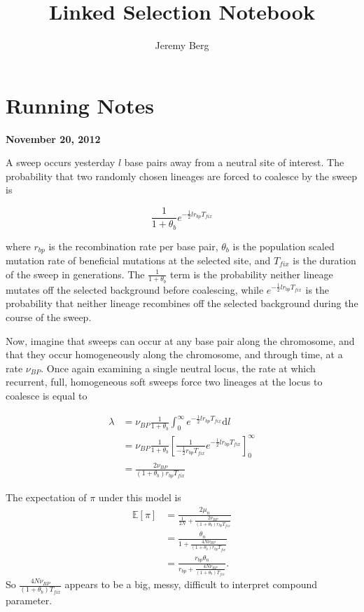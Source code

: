 \documentclass[reqno]{amsart}
\begin{document}
\title{Linked Selection Notebook}
\author{Jeremy Berg}
\date{}
\maketitle



\section*{Running Notes}

\begin{flushright}
	\textbf{November 20, 2012}
\end{flushright}

A sweep occurs yesterday $l$ base pairs away from a neutral site of interest. The probability that two randomly chosen lineages are forced to coalesce by the sweep is


$$\frac{1}{1 + \theta_b}e^{-\frac{1}{2}lr_{bp}T_{fix}}$$

where $r_{bp}$ is the recombination rate per base pair, $\theta_b$ is the population scaled mutation rate of beneficial mutations at the selected site, and $T_{fix}$ is the duration of the sweep in generations\cite{Pennings2006}. The $\frac{1}{1 + \theta_b}$ term is the probability neither lineage mutates off the selected background before coalescing, while $e^{-\frac{1}{2}lr_{bp}T_{fix}}$ is the probability that neither lineage recombines off the selected background during the course of the sweep.

Now, imagine that sweeps can occur at any base pair along the chromosome, and that they occur homogeneously along the chromosome, and through time, at a rate $\nu_{BP}$. Once again examining a single neutral locus, the rate at which recurrent, full, homogeneous soft sweeps force two lineages at the locus to coalesce is equal to


\begin{align}
	\lambda &= \nu_{BP}\frac{1}{1+\theta_b}\int_0^\infty e^{-\frac{1}{2}lr_{bp}T_{fix}}\mathrm d l\\
	& = \nu_{BP}\frac{1}{1+\theta_b}\left[\frac{1}{-\frac{1}{2}r_{bp}T_{fix}}e^{-\frac{1}{2}lr_{bp}T_{fix}}\right]_0^\infty \\
	&= \frac{2\nu_{BP}}{\left(1+\theta_b\right)r_{bp}T_{fix}}
\end{align}

The expectation of $\pi$ under this model is
\begin{align}
	\mathbb{E}\left[\pi\right] &= \frac{2\mu_n}{\frac{1}{2N} +  \frac{2\nu_{BP}}{\left(1+\theta_b\right)r_{bp}T_{fix}}} \\
	&= \frac{\theta_n}{1 + \frac{4N\nu_{BP}}{\left(1+\theta_b\right)r_{bp}T_{fix}}} \\
	& = \frac{r_{bp}\theta_n}{r_{bp} + \frac{4N\nu_{BP}}{\left(1+\theta_b\right)T_{fix}}}.
\end{align}
So $\frac{4N\nu_{BP}}{\left(1+\theta_b\right)T_{fix}}$ appears to be a big, messy, difficult to interpret compound parameter.
\end{document}
